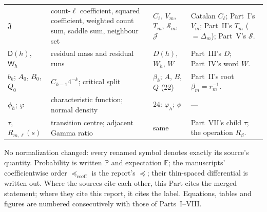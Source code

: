 \documentclass[11pt,a4paper]{article}
\theoremstyle{definition}\newaliascnt{definition}{theorem}
\theoremstyle{remark}\newaliascnt{remark}{theorem}
\newcommand{\preceqc}{\preceq}
\newcommand{\ljP}{\mathbb P}
\newcommand{\ljE}{\mathbb E}
\begin{document}
\begin{table}[htbp]
\begin{tabular}{@{}>{\raggedright}p{.17\linewidth}>{\raggedright}p{.31\linewidth}>{\raggedright}p{.17\linewidth}>{\raggedright\arraybackslash}p{.26\linewidth}@{}}
 $\mathfrak J$ & count-$\ell$ coefficient, squared coefficient, weighted
 count sum, saddle sum, neighbour set & $C_\ell$, $V_m$, $T_m$,
 $\mathcal S_m$, $\mathcal J$ & Catalan $C_\ell$; Part~I's $V_m$; Part~II's
 $T_m$ ($=\Delta_m$); Part~V's $\mathcal S$.\\
$\mathsf D(h)$, $\mathsf W_h$ & residual mass and residual runs & $D(h)$,
 $W_h$, $W$ & Part~III's $D$; Part~IV's word $W$.\\
$b_k$; $A_0$, $B_0$, $Q_0$ & $C_{k-1}4^{-k}$; critical split & $\beta_k$;
 $A$, $B$, $Q$ (22) & Part~II's root $\beta_m=r_m^{-1}$.\\
$\phi_h$; $\varphi$ & characteristic function; normal density & 24:
 $\varphi_h$; $\phi$ & ---\\
$\tau$, $R_{m,\ell}(s)$ & transition centre; adjacent Gamma ratio & same &
 Part~VII's child $\tau$; the operation $R_\beta$.\\
\bottomrule
\end{tabular}
\end{table}

No normalization changed: every renamed symbol denotes exactly its source's
quantity. Probability is written $\ljP$ and expectation $\ljE$; the
manuscripts' coefficientwise order $\preceq_{\mathrm{coeff}}$ is the report's
$\preceqc$; their thin-spaced differential is written out. Where the sources
cite each other, this Part cites the merged statement; where they cite this
report, it cites the label. Equations, tables and figures are numbered
consecutively with those of Parts~I--VIII.
\end{document}
